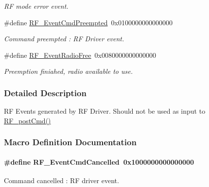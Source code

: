 \begin{DoxyCompactItemize}
\begin{DoxyCompactList}\small\item\em R\+F mode error event. \end{DoxyCompactList}\item 
\#define \hyperlink{group___r_f___driver___events_ga267ffc8a08c3ce6ffa82b704dba641be}{R\+F\+\_\+\+Event\+Cmd\+Preempted}~0x0100000000000000
\begin{DoxyCompactList}\small\item\em Command preempted \+: R\+F Driver event. \end{DoxyCompactList}\item 
\#define \hyperlink{group___r_f___driver___events_ga9742a8b624a11e7033f3c7ec4c283797}{R\+F\+\_\+\+Event\+Radio\+Free}~0x0080000000000000
\begin{DoxyCompactList}\small\item\em Preemption finiahed, radio available to use. \end{DoxyCompactList}\end{DoxyCompactItemize}


\subsubsection{Detailed Description}
R\+F Events generated by R\+F Driver. Should not be used as input to \hyperlink{_r_f_8h_a2b0ee444fcb74917df94eefea804ecbb}{R\+F\+\_\+post\+Cmd()} 

\subsubsection{Macro Definition Documentation}
\paragraph[{R\+F\+\_\+\+Event\+Cmd\+Cancelled}]{\setlength{\rightskip}{0pt plus 5cm}\#define R\+F\+\_\+\+Event\+Cmd\+Cancelled~0x1000000000000000}\label{group___r_f___driver___events_gae6d21f9806a7482a0f324f98bb83aac0}


Command cancelled \+: R\+F driver event. 

